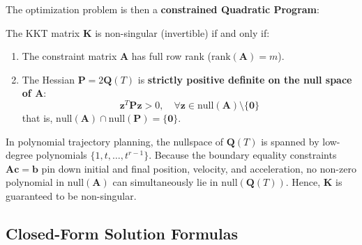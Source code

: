 \documentclass[11pt,a4paper]{article}
\begin{document}
The optimization problem is then a \textbf{constrained Quadratic Program}:
\begin{definitionbox}
The KKT matrix $\mathbf{K}$ is non-singular (invertible) if and only if:
\begin{enumerate}
    \item The constraint matrix $\mathbf{A}$ has full row rank ($\mathrm{rank}(\mathbf{A}) = m$).
    \item The Hessian $\mathbf{P} = 2\mathbf{Q}(T)$ is \textbf{strictly positive definite on the null space of $\mathbf{A}$}:
    \begin{equation}
    \mathbf{z}^T \mathbf{P} \mathbf{z} > 0, \quad \forall \mathbf{z} \in \mathrm{null}(\mathbf{A}) \setminus \{\mathbf{0}\}
    \end{equation}
    that is, $\mathrm{null}(\mathbf{A}) \cap \mathrm{null}(\mathbf{P}) = \{\mathbf{0}\}$.
\end{enumerate}
In polynomial trajectory planning, the nullspace of $\mathbf{Q}(T)$ is spanned by low-degree polynomials $\{1, t, \dots, t^{r-1}\}$. Because the boundary equality constraints $\mathbf{A}\mathbf{c} = \mathbf{b}$ pin down initial and final position, velocity, and acceleration, no non-zero polynomial in $\mathrm{null}(\mathbf{A})$ can simultaneously lie in $\mathrm{null}(\mathbf{Q}(T))$. Hence, $\mathbf{K}$ is guaranteed to be non-singular.
\end{definitionbox}

\subsection{Closed-Form Solution Formulas}
\end{document}
